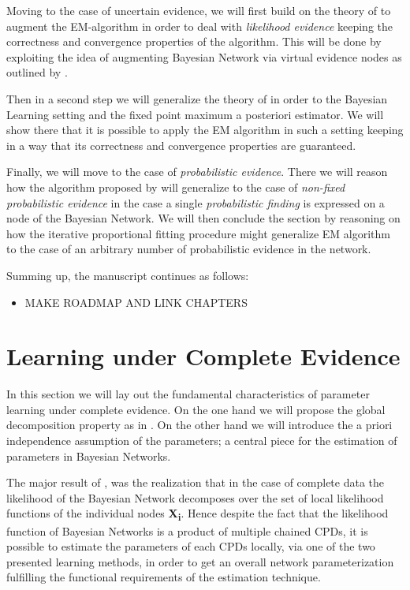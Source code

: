 \documentclass[11pt]{article}
\begin{document}
\begin{article}
Moving to the case of uncertain evidence, we will first build on
the theory of \cite{Wasserkrug_all} to augment the EM-algorithm in
order to deal with \emph{likelihood evidence} keeping the correctness
and convergence properties of the algorithm. This will be done by
exploiting the idea of augmenting Bayesian Network via virtual
evidence nodes as outlined by \cite{pearl2014probabilistic}.

Then in a second step we will generalize the theory of
\cite{Wasserkrug_all} in order to the Bayesian Learning setting and
the fixed point maximum a posteriori estimator. We will show there
that it is possible to apply the EM algorithm in such a setting
keeping in a way that its correctness and convergence properties
are guaranteed.

Finally, we will move to the case of \emph{probabilistic
evidence}. There we will reason how the algorithm proposed by
\cite{Wasserkrug_all} will generalize to the case of \emph{non-fixed
probabilistic evidence} in the case a single \emph{probabilistic
finding} is expressed on a node of the Bayesian Network. We will
then conclude the section by reasoning on how the iterative
proportional fitting procedure might generalize EM algorithm to the
case of an arbitrary number of probabilistic evidence in the
network.

Summing up, the manuscript continues as follows:

\begin{itemize}
\item MAKE ROADMAP AND LINK CHAPTERS
\end{itemize}


\section{Learning under Complete Evidence}
\label{complete-learning}
In this section we will lay out the fundamental characteristics of
parameter learning under complete evidence. On the one hand we will
propose the global decomposition property as in
\cite{spiegelhalter1990sequential}. On the other hand we will
introduce the a priori independence assumption of the parameters; a
central piece for the estimation of parameters in Bayesian Networks.

The major result of \cite{spiegelhalter1990sequential}, was the
realization that in the case of complete data the likelihood of the
Bayesian Network decomposes over the set of local likelihood
functions of the individual nodes \textbf{X\textsubscript{i}}. Hence despite the fact that
the likelihood function of Bayesian Networks is a product of
multiple chained CPDs, it is possible to estimate the parameters of
each CPDs locally, via one of the two presented learning methods, in
order to get an overall network parameterization fulfilling the
functional requirements of the estimation technique.


\end{article}
\end{document}

